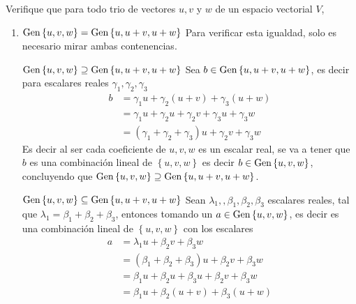 \item Verifique que para todo trio de vectores \(u, v\) y \(w\) de un espacio vectorial \(V\),
    \begin{enumerate}[label=\listAlph]
        \item \(\text{Gen} \left\{ u, v, w \right\} = \text{Gen} \left\{ u, u + v, u + w \right\}\)
            Para verificar esta igualdad, solo es necesario mirar ambas contenencias.
            \ResetCases{}
            \begin{mathcase}{{\(\text{Gen} \left\{ u, v, w \right\} \supseteq \text{Gen} \left\{ u, u + v, u + w \right\}\)}}
                Sea \(b \in \text{Gen} \left\{ u, u + v, u + w \right\}\), es decir para escalares reales \(\gamma_1, \gamma_2, \gamma_3\)
                \[
                    \begin{aligned}
                        b 
                        &= \gamma_1 u + \gamma_2 (u + v) + \gamma_3 (u + w) \\
                        &= \gamma_1 u + \gamma_2 u + \gamma_2 v + \gamma_3 u + \gamma_3 w \\
                        &= (\gamma_1 + \gamma_2 + \gamma_3) u + \gamma_2 v + \gamma_3 w
                    \end{aligned}
                \]
                Es decir al ser cada coeficiente de \(u, v, w\) es un escalar real, se va a tener que 
                \(b\) es una combinación lineal de \(\left\{u, v, w\right\}\) es decir \(b \in \text{Gen} \left\{ u, v, w \right\}\), concluyendo que \(\text{Gen} \left\{ u, v, w \right\} \supseteq \text{Gen} \left\{ u, u + v, u + w \right\}\).
            \end{mathcase}
            \begin{mathcase}{{\(\text{Gen} \left\{ u, v, w \right\} \subseteq \text{Gen} \left\{ u, u + v, u + w \right\}\)}}
                Sean \(\lambda_1,, \beta_1, \beta_2, \beta_3\) escalares reales, tal que \(\lambda_1 = \beta_1 + \beta_2 + \beta_3\),
                entonces tomando un \(a \in \text{Gen} \left\{ u, v, w \right\}\), es decir es una combinación lineal de \(\left\{u, v, w\right\}\) con los escalares
                \[
                    \begin{aligned}
                        a 
                        &= \lambda_1 u + \beta_2 v + \beta_3 w \\
                        &= \left(\beta_1 + \beta_2 + \beta_3\right) u + \beta_2 v + \beta_3 w \\
                        &= \beta_1 u + \beta_2 u + \beta_3 u + \beta_2 v + \beta_3 w \\
                        &= \beta_1 u + \beta_2 (u + v) + \beta_3 (u + w) \\
                    \end{aligned}
\]
\end{mathcase}
\end{enumerate}
